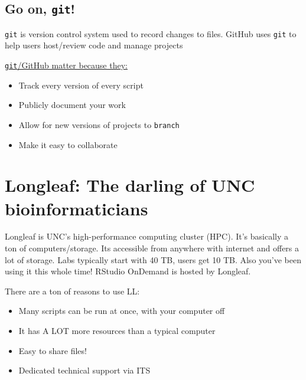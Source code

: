 \documentclass[
  letterpaper,
  DIV=11,
  numbers=noendperiod]{scrreprt}
\begin{document}
\subsection{\texorpdfstring{Go on,
\texttt{git}!}{Go on, git!}}\label{go-on-git}

\texttt{git} is version control system used to record changes to files.
{GitHub} uses \texttt{git} to help users host/review code and manage
projects

\ul{\texttt{git}/GitHub matter because they:}

\begin{itemize}
\item
  Track every version of every script
\item
  Publicly document your work
\item
  Allow for new versions of projects to \texttt{branch}
\item
  Make it easy to collaborate
\end{itemize}

\section{Longleaf: The darling of UNC
bioinformaticians}\label{longleaf-the-darling-of-unc-bioinformaticians}

Longleaf is UNC's high-performance computing cluster (HPC). It's
basically a ton of computers/storage. Its accessible from anywhere with
internet and offers a lot of storage. Labs typically start with 40 TB,
users get 10 TB. Also you've been using it this whole time! RStudio
OnDemand is hosted by Longleaf.

\begin{tcolorbox}[enhanced jigsaw, bottomtitle=1mm, bottomrule=.15mm, toprule=.15mm, opacityback=0, leftrule=.75mm, breakable, colback=white, toptitle=1mm, left=2mm, coltitle=black, titlerule=0mm, opacitybacktitle=0.6, title=\textcolor{quarto-callout-tip-color}{\faLightbulb}\hspace{0.5em}{Tip}, rightrule=.15mm, arc=.35mm, colframe=quarto-callout-tip-color-frame, colbacktitle=quarto-callout-tip-color!10!white]

There are a ton of reasons to use LL:

\begin{itemize}
\item
  Many scripts can be run at once, with your computer off
\item
  It has A LOT more resources than a typical computer
\item
  Easy to share files!
\item
  Dedicated technical support via ITS
\end{itemize}

\end{tcolorbox}
\end{document}
